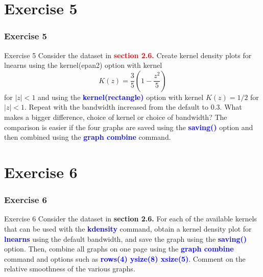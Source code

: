 \documentclass[11pt, aspectratio=169]{beamer}
\begin{document}
	\section{Exercise 5}
		\begin{frame}
			\frametitle{Exercise 5}
			\begin{block}{Exercise 5}
				 Consider the dataset in \textcolor{red}{\textbf{section 2.6.}} Create kernel density plots for
				lnearns using the kernel(epan2) option with kernel 
					\begin{equation*}
						K(z) = \dfrac{3}{5}\left(1 - \dfrac{z^{2}}{5}\right)
					\end{equation*}
				for $|z| < 1$ and using the \textcolor{blue}{\textbf{kernel(rectangle)}} option with kernel
				$K(z) = 1/2$ for $|z| < 1$. Repeat with the bandwidth increased from the default to 0.3. What
				makes a bigger difference, choice of kernel or choice of bandwidth?
				The comparison is easier if the four graphs are saved using the
				\textcolor{blue}{\textbf{saving()}} option and then combined using the \textcolor{blue}{\textbf{graph combine}} command.
			\end{block}
		\end{frame}
	\section{Exercise 6}
		\begin{frame}
			\frametitle{Exercise 6}
			\begin{block}{Exercise 6}
				Consider the dataset in \textcolor{red!50}{\textbf{section 2.6.}} For each of the available kernels
				that can be used with the \textcolor{blue}{\textbf{kdensity}} command, obtain a kernel density
				plot for \textcolor{blue}{\textbf{lnearns}} using the default bandwidth, and save the graph using
				the \textcolor{blue}{\textbf{saving()}} option. Then, combine all graphs on one page using the
				\textcolor{blue}{\textbf{graph combine}} command and options such as \textcolor{blue}{\textbf{rows(4) ysize(8) xsize(5)}}.
				Comment on the relative smoothness of the various graphs.
			\end{block}
		\end{frame}
\end{document}
